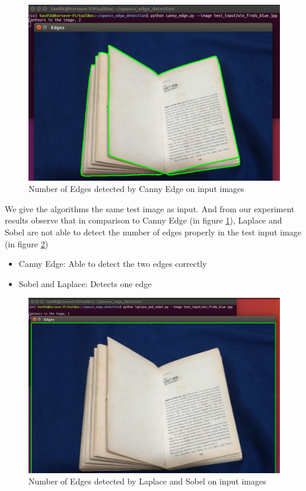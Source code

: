 \documentclass[BTech]{srmuthesis}
\begin{document}
\begin{figure}[h!]
    \centering
    \includegraphics[width=15cm\textwidth]{number_of_edges_canny}
    \caption{Number of Edges detected by Canny Edge on input images}
    \label{fig:Number of Edges detected by canny on input images}
\end{figure}

We give the algorithms the same test image as input. And from our experiment results observe that in comparison to Canny Edge (in figure \ref{fig:Number of Edges detected by canny on input images}), Laplace and Sobel are not able to detect the number of edges properly in the test input image (in figure \ref{fig:Number of Edges detected by Laplace and Sobel on input images})

\begin{itemize}
    \item Canny Edge: Able to detect the two edges correctly
    \item Sobel and Laplace: Detects one edge
\end{itemize}

\begin{figure}[h!]
    \centering
    \includegraphics[width=15cm\textwidth]{number_of_edges_laplace_sobel}
    \caption{Number of Edges detected by Laplace and Sobel on input images}
    \label{fig:Number of Edges detected by Laplace and Sobel on input images}
\end{figure}
\end{document}
